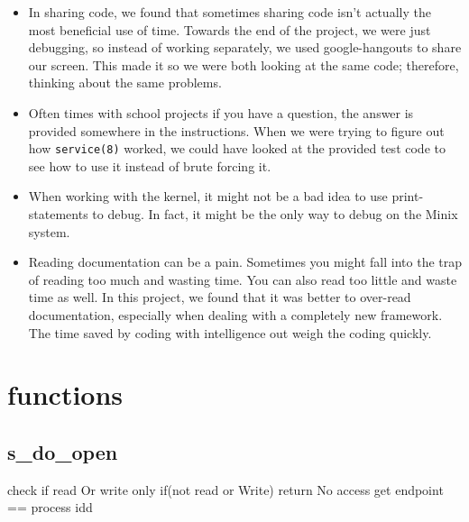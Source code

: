 \documentclass[11pt]{article}
\begin{document}
\begin{adjustwidth}{.2in}{}{

   \begin{itemize}

      \item In sharing code, we found that sometimes sharing code isn't actually the
         most beneficial use of time. Towards the end of the project, we were just
         debugging, so instead of working separately, we used google-hangouts to
         share our screen. This made it so we were both looking at the same code;
         therefore, thinking about the same problems.

      \item Often times with school projects if you have a question, the answer is
         provided somewhere in the instructions. When we were trying to figure out
         how {\tt service(8)} worked, we could have looked at the provided test
         code to see how to use it instead of brute forcing it.

      \item When working with the kernel, it might not be a bad idea to use
         print-statements to debug. In fact, it might be the only way to debug on the
         Minix system. 

      \item Reading documentation can be a pain. Sometimes you might fall into
         the trap of reading too much and wasting time. You can also read too
         little and waste time as well. In this project, we found that it was
         better to over-read documentation, especially when dealing with a
         completely new framework. The time saved by coding with intelligence out
         weigh the coding quickly.


   \end{itemize}


}\end{adjustwidth}


\section{functions}
   
\subsection{s\_do\_open}
   check if read Or write only
   if(not read or Write)
      return No access
   get endpoint == process idd
\end{document}
